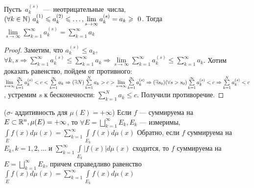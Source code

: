 \begin{lemma}
	\mbox{Пусть $a_k^{(s)}$ --- неотрицательные числа, $(\forall k\in \N)\ a_k^{(1)}\leqslant a_k^{(2)}\leqslant \ldots, \lim\limits_{s\to\infty}a_k^{(s)}=a_k \geqslant~0$.} 
	Тогда $\lim\limits_{s\to\infty}\sum\limits_{k=1}^\infty a_k^{(s)}=\sum\limits_{k=1}^\infty a_k$
\end{lemma}

\begin{proof}
	Заметим, что $a_k^{(s)}\leqslant a_k$, $\forall k, s \Rightarrow\sum\limits_{k=1}^\infty a_k^{(s)} \leqslant \sum\limits_{k=1}^\infty a_k \Rightarrow \lim\limits_{s\to\infty}\sum\limits_{k=1}^\infty a_k^{(s)}\leqslant \sum\limits_{k=1}^\infty a_k$. Хотим доказать равенство, пойдем от противного: $\lim\limits_{s\to\infty}\sum\limits_{k=1}^\infty a_k^{(s)}< c <\sum\limits_{k=1}^\infty a_k \Rightarrow \\ (\exists N)\sum\limits_{k=1}^N a_k >c> \lim\limits_{s\to\infty} \sum\limits_{k=1}^\infty a_k^{(s)}\Rightarrow (\exists s_0)(\forall s>s_0)\sum\limits_{k=1}^\infty a_k^{(s)}<c\Rightarrow \sum\limits_{k=1}^N a_k^{(s)}<c$, устремим $s$ к бесконечности: $\sum\limits_{k=1}^N a_k \leqslant c$. Получили противоречие.
\end{proof}

\begin{prop}($\sigma$- аддитивность для $\mu(E)=+\infty$)
	Если $f$ --- суммируема на $E\subset \R^n, \mu(E)=+\infty$, то $\forall E=\bigsqcup\limits_{k=1}^\infty E_k, E_k$ --- измеримы, $\int\limits_{E}f(x)d\mu(x)=\sum\limits_{k=1}^\infty \int\limits_{E_k}f(x)d\mu(x)$ Обратно, если $f$ суммируема на $E_k, k=1,2,\ldots$ и $\sum\limits_{k=1}^\infty\int\limits_{E_k}|f(x)|d\mu(x)$ сходится, то $f$ суммируема на $E=\bigsqcup\limits_{k=1}^\infty E_k$, причем справедливо равенство $\int\limits_{E}f(x)d\mu(x)=\sum\limits_{k=1}^\infty \int\limits_{E_k}f(x)d\mu(x)$
\end{prop}